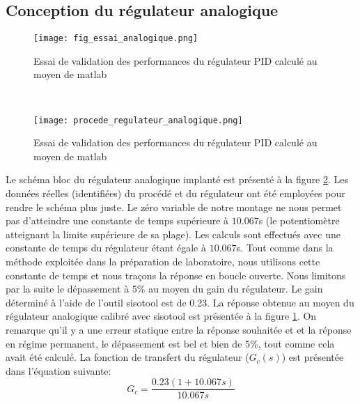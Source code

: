 \subsection{Conception du régulateur  analogique}
\begin{figure}[htb]
\centering
\texttt{[image: fig\_essai\_analogique.png]}
\caption{Essai de validation des performances du régulateur PID calculé au moyen de matlab}
\label{fig8}
\end{figure}\
\begin{figure}[htb]
\centering
\texttt{[image: procede\_regulateur\_analogique.png]}
\caption{Essai de validation des performances du régulateur PID calculé au moyen de matlab}
\label{fig9}
\end{figure}
Le schéma bloc du régulateur analogique implanté est présenté à la figure \ref{fig9}. Les données réelles (identifiées) du procédé et du régulateur ont été employées pour rendre le schéma plus juste. Le zéro variable de notre montage ne nous permet pas d'atteindre une constante de temps supérieure à $10.067$s (le potentiomètre atteignant la limite supérieure de sa plage). Les calculs sont effectués avec une constante de temps du régulateur étant égale à $10.067$s. Tout comme dans la méthode exploitée dans la préparation de laboratoire, nous utilisons cette constante de temps et nous traçons la réponse en boucle ouverte. Nous limitons par la suite le dépassement à 5\% au moyen du gain du régulateur. Le gain déterminé à l'aide de l'outil sisotool est de 0.23. La réponse obtenue au moyen du régulateur analogique calibré avec sisotool est présentée à la figure \ref{fig8}. On remarque qu'il y a une erreur statique entre la réponse souhaitée et et la réponse en régime permanent, le dépassement est bel et bien de 5\%, tout comme cela avait été calculé.  La fonction de transfert du régulateur ($G_c(s)$) est présentée dans l'équation suivante:
\begin{equation}
G_c = \frac{0.23(1 + 10.067s)}{10.067s}
\end{equation}
